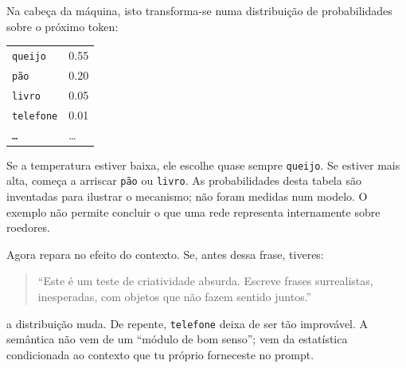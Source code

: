Na cabeça da máquina, isto transforma-se numa distribuição de probabilidades sobre o próximo token:

\begin{center}
\begin{tabular}{ll}
\texttt{queijo} & 0.55 \\
\texttt{pão} & 0.20 \\
\texttt{livro} & 0.05 \\
\texttt{telefone} & 0.01 \\
\texttt{…} & \dots
\end{tabular}
\end{center}


Se a temperatura estiver baixa, ele escolhe quase sempre \texttt{queijo}. Se estiver mais alta, começa a arriscar \texttt{pão} ou \texttt{livro}. As probabilidades desta tabela são inventadas para ilustrar o mecanismo; não foram medidas num modelo. O exemplo não permite concluir o que uma rede representa internamente sobre roedores.

Agora repara no efeito do contexto. Se, antes dessa frase, tiveres:

\begin{quote}
\small
“Este é um teste de criatividade absurda. Escreve frases surrealistas, inesperadas, com objetos que não fazem sentido juntos.”
\end{quote}

a distribuição muda. De repente, \texttt{telefone} deixa de ser tão improvável. A semântica não vem de um “módulo de bom senso”; vem da estatística condicionada ao contexto que tu próprio forneceste no prompt.

